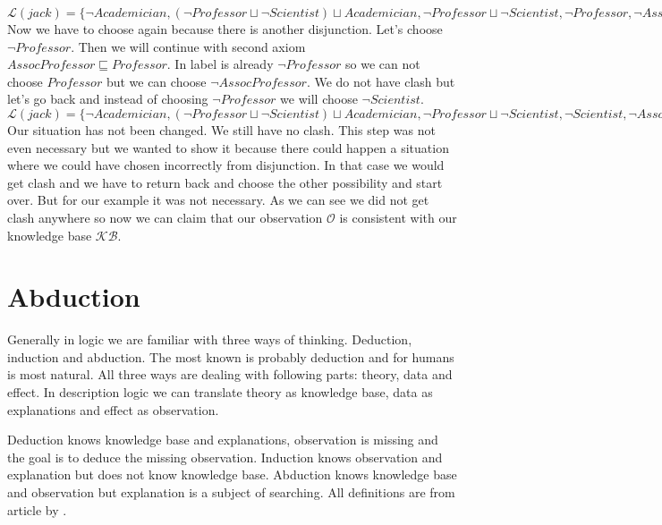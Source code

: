 \documentclass[12pt,a4paper]{article}
\begin{document}
$ \mathcal{L}(jack) = \{ \neg Academician, (\neg Professor \sqcup \neg Scientist) \sqcup Academician, \neg Professor \sqcup \neg Scientist, \neg Professor,  \neg AssocProfessor \sqcup Professor, \neg AssocProfessor \} $ \\

Now we have to choose again because there is another disjunction. Let's choose $\neg Professor$. Then we will continue with second axiom $AssocProfessor \sqsubseteq Professor$. In label is already $\neg Professor$ so we can not choose $Professor$ but we can choose $\neg AssocProfessor$. We do not have clash but let's go back and 
instead of choosing $\neg Professor$ we will choose $\neg Scientist$. \\

$ \mathcal{L}(jack) = \{ \neg Academician, (\neg Professor \sqcup \neg Scientist) \sqcup Academician, \neg Professor \sqcup \neg Scientist, \neg Scientist,  \neg AssocProfessor \sqcup Professor, \neg AssocProfessor \} $ \\

Our situation has not been changed. We still have no clash. This step was not even necessary but we wanted to show it because there could happen a situation where we could have chosen incorrectly from disjunction. In that case we would get clash and we have to return back and choose the other possibility and start over. But for our example it was not necessary. As we can see we did not get clash anywhere so now we can claim that our observation $\mathcal{O}$ is consistent with our knowledge base $\mathcal{KB}$.


\section{Abduction}
Generally in logic we are familiar with three ways of thinking. Deduction, induction and abduction. The most known is probably deduction and for humans is most natural. All three ways are dealing with following parts: theory, data and effect. In description logic we can translate theory as knowledge base, data as explanations and  effect as observation.

Deduction knows knowledge base and explanations, observation is missing and the goal is to deduce the missing observation. Induction knows observation and explanation but does not know knowledge base. Abduction knows knowledge base and observation but explanation is a subject of searching. All definitions are from article by \citep{pukancovaAboxAbduction}.
\end{document}
